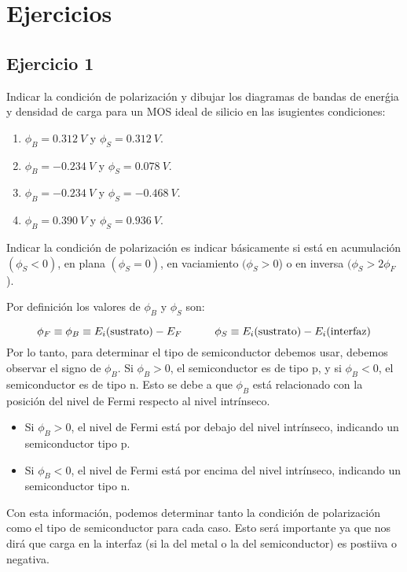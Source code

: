 
\section*{Ejercicios}



\begin{Enunciado}
	\subsection*{Ejercicio 1}

	Indicar la condición de polarización y dibujar los diagramas de bandas de enerǵia y densidad de carga para un MOS ideal de silicio en las isugientes condiciones:

	\begin{enumerate}[label=\alph*)]
		\item $\phi_B= \SI{0.312}{V}$  y  $\phi_S= \SI{0.312}{V}$. 
		\item $\phi_B= -\SI{0.234}{V}$  y  $\phi_S= \SI{0.078}{V}$. 
		\item $\phi_B= -\SI{0.234}{V}$  y  $\phi_S= -\SI{0.468}{V}$. 
		\item $\phi_B= \SI{0.390}{V}$  y  $\phi_S= \SI{0.936}{V}$. 
	\end{enumerate}
\end{Enunciado}

\vspace*{1em}

Indicar la condición de polarización es indicar básicamente si está en acumulación $(\phi_S<0)$, en plana $(\phi_S=0)$, en vaciamiento $(\phi_S>0$) o en inversa $(\phi_S>2\phi_F$). 

Por definición los valores de $\phi_B$ y $\phi_S$ son:

\begin{equation*}
	\phi_F \equiv \phi_B \equiv E_i(\text{sustrato}) - E_F \quad \quad \quad 
	\phi_S \equiv E_i(\text{sustrato}) - E_i (\text{interfaz}) 
\end{equation*}
Por lo tanto, para determinar el tipo de semiconductor debemos usar, debemos observar el signo de $\phi_B$. Si $\phi_B > 0$, el semiconductor es de tipo p, y si $\phi_B < 0$, el semiconductor es de tipo n. Esto se debe a que $\phi_B$ está relacionado con la posición del nivel de Fermi respecto al nivel intrínseco.
\begin{itemize}
	\item Si $\phi_B > 0$, el nivel de Fermi está por debajo del nivel intrínseco, indicando un semiconductor tipo p.
	\item Si $\phi_B < 0$, el nivel de Fermi está por encima del nivel intrínseco, indicando un semiconductor tipo n.
\end{itemize}
Con esta información, podemos determinar tanto la condición de polarización como el tipo de semiconductor para cada caso. Esto será importante ya que nos dirá que carga en la interfaz (si la del metal o la del semiconductor) es postiiva o negativa. 


